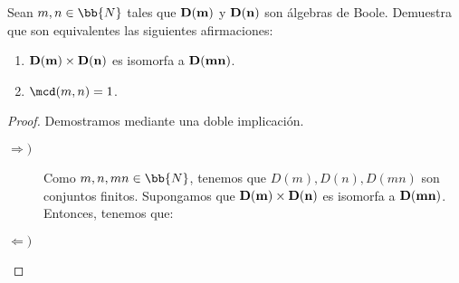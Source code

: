 \begin{ejercicio}
    Sean $m,n\in \bb{N}$ tales que $\bf{D}(m)$ y $\bf{D}(n)$ son álgebras de Boole. Demuestra que son equivalentes las siguientes afirmaciones:
    \begin{enumerate}
        \item $\bf{D}(m)\times \bf{D}(n)$ es isomorfa a $\bf{D}(mn)$.
        \item $\mcd(m,n)=1$.
    \end{enumerate}
    \begin{proof}
        Demostramos mediante una doble implicación.
        \begin{description}
            \item[$\Longrightarrow)$]
            
            Como $m,n,mn\in \bb{N}$, tenemos que $D(m),D(n),D(mn)$ son conjuntos finitos.
            Supongamos que $\bf{D}(m)\times \bf{D}(n)$ es isomorfa a $\bf{D}(mn)$. Entonces, tenemos que:
            
            \item[$\Longleftarrow)$]
        \end{description}
    \end{proof}
\end{ejercicio}


